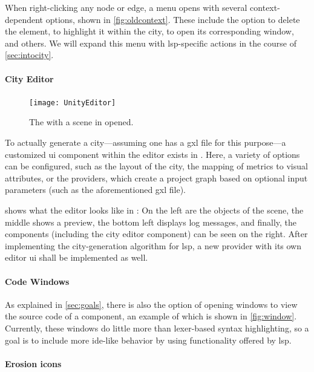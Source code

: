 \documentclass[../thesis]{subfiles}
\begin{document}
When right-clicking any node or edge, a menu opens with several context-dependent options, shown in \cref{fig:oldcontext}.
These include the option to delete the element, to highlight it within the \gls{city}, to open its corresponding \gls{window}, and others.
We will expand this menu with \gls{lsp}-specific actions in the course of \cref{sec:intocity}.

\paragraph{City Editor}

\begin{figure}
	\begin{center}
		\texttt{[image: UnityEditor]}
	\end{center}
	\caption{The  with a scene in \SEE{} opened.}\label{fig:editor}
\end{figure}

To actually generate a \gls{city}---assuming one has a \gls{gxl} file for this purpose---a customized \gls{ui} component within the \gls{editor} exists in \SEE{}.
Here, a variety of options can be configured, such as the layout of the city, the mapping of metrics to visual attributes, or the \glspl*{provider}, which create a project graph based on optional input parameters (such as the aforementioned \gls{gxl} file).

 shows what the \gls{editor} looks like in \SEE{}:
On the left are the objects of the scene, the middle shows a preview, the bottom left displays log messages, and finally, the components (including the city editor component) can be seen on the right.
After implementing the city-generation algorithm for \gls{lsp}, a new \gls{provider} with its own \gls{editor} \gls{ui} shall be implemented as well.

\paragraph{Code Windows}
As explained in \cref{sec:goals}, there is also the option of opening \glspl{window} to view the source code of a component, an example of which is shown in \cref{fig:window}.
Currently, these windows do little more than lexer-based syntax highlighting, so a goal is to include more \gls{ide}-like behavior by using functionality offered by \gls{lsp}.

\paragraph{Erosion icons}
\end{document}
